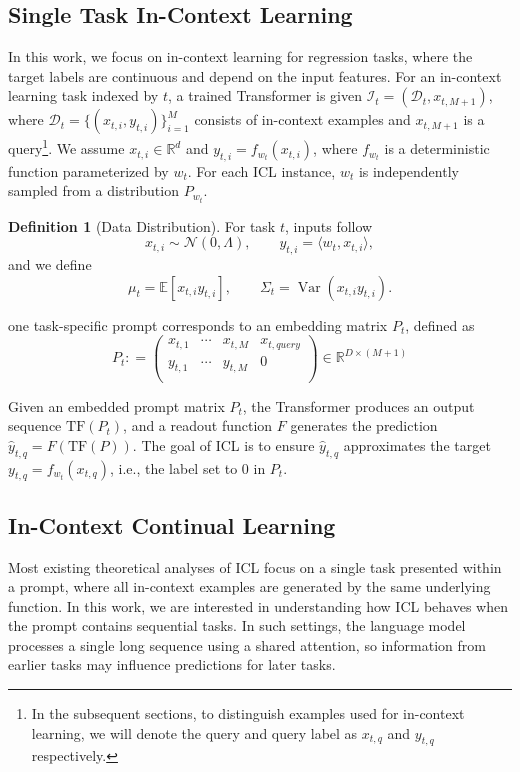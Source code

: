 \documentclass{article}
\theoremstyle{plain}
\theoremstyle{definition}
\newtheorem{definition}[theorem]{Definition}
\theoremstyle{remark}
\begin{document}
\subsection{Single Task In-Context Learning}
In this work, we focus on in-context learning for regression tasks, where the target labels are continuous and depend on the input features. For an in-context learning task indexed by $t$, a trained Transformer is given $\mathcal{I}_t=(\mathcal{D}_t,x_{t,M+1})$, where $\mathcal{D}_t=\{(x_{t,i},y_{t,i})\}_{i=1}^M$ consists of in-context examples and $x_{t,M+1}$ is a query\footnote{In the subsequent sections, to distinguish examples used for in-context learning, we will denote the query and query label as \(x_{t,q}\) and \(y_{t,q}\) respectively.}. We assume $x_{t,i}\in\mathbb{R}^d$ and $y_{t,i}=f_{w_{t}}(x_{t,i})$, where $f_{w_t}$ is a deterministic function parameterized by $w_t$. For each ICL instance, $w_t$ is independently sampled from a distribution $P_{w_t}$.

\begin{definition}[Data Distribution]
For task $t$, inputs follow
\[
x_{t,i}\sim\mathcal N(0,\Lambda),\qquad
y_{t,i}=\langle w_t,x_{t,i}\rangle,
\]
and we define
\[
\mu_t=\mathbb E[x_{t,i}y_{t,i}],\qquad
\Sigma_t=\operatorname{Var}(x_{t,i}y_{t,i}).
\]
\end{definition}

one task-specific prompt corresponds to an embedding matrix $P_{t}$, defined as
\begin{equation}
\label{p_t}
    P_{t}: = \begin{pmatrix}
  x_{t,1}&\cdots  & x_{t,M} & x_{t,query} \\
  y_{t,1}&\cdots  & y_{t,M} & 0 \\
\end{pmatrix}\in \mathbb{R}^{D\times (M+1)}
\end{equation}

Given an embedded prompt matrix $P_t$, the Transformer produces an output sequence $\mathrm{TF}(P_t)$, and a readout function $F$ generates the prediction $\hat y_{t,q}=F(\mathrm{TF}(P))$. The goal of ICL is to ensure $\hat y_{t,q}$ approximates the target $y_{t,q}=f_{w_t}(x_{t,q})$, i.e., the label set to $0$ in $P_t$.

\subsection{In-Context Continual Learning}
Most existing theoretical analyses of ICL focus on a single task presented within a prompt, where all in-context examples are generated by the same underlying function. In this work, we are interested in understanding how ICL behaves when the prompt contains sequential tasks. In such settings, the language model processes a single long sequence using a shared attention, so information from earlier tasks may influence predictions for later tasks. 
\end{document}
